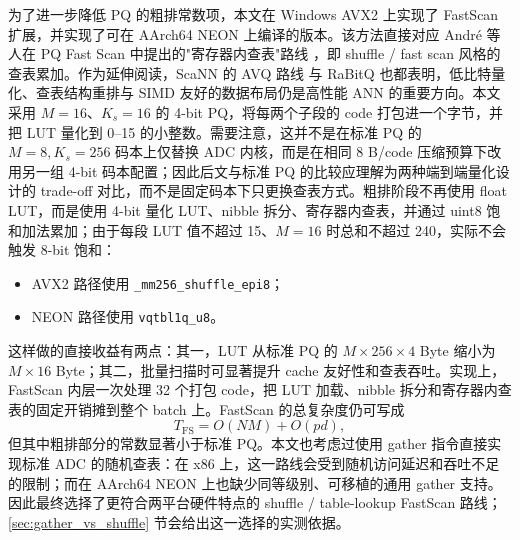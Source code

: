 \documentclass[a4paper,11pt,UTF8]{ctexart}
\begin{document}
为了进一步降低 PQ 的粗排常数项，本文在 Windows AVX2 上实现了 FastScan 扩展，并实现了可在 AArch64 NEON 上编译的版本。该方法直接对应 André 等人在 PQ Fast Scan 中提出的"寄存器内查表"路线 \cite{andre2015fastscan}，即 shuffle / fast scan 风格的查表累加。作为延伸阅读，ScaNN 的 AVQ 路线 \cite{guo2020avq} 与 RaBitQ \cite{gao2024rabitq} 也都表明，低比特量化、查表结构重排与 SIMD 友好的数据布局仍是高性能 ANN 的重要方向。本文采用 $M=16$、$K_s=16$ 的 4-bit PQ，将每两个子段的 code 打包进一个字节，并把 LUT 量化到 0--15 的小整数。需要注意，这并不是在标准 PQ 的 $M=8, K_s=256$ 码本上仅替换 ADC 内核，而是在相同 8 B/code 压缩预算下改用另一组 4-bit 码本配置；因此后文与标准 PQ 的比较应理解为两种端到端量化设计的 trade-off 对比，而不是固定码本下只更换查表方式。粗排阶段不再使用 float LUT，而是使用 4-bit 量化 LUT、nibble 拆分、寄存器内查表，并通过 uint8 饱和加法累加；由于每段 LUT 值不超过 15、$M=16$ 时总和不超过 240，实际不会触发 8-bit 饱和：
\begin{itemize}
  \item AVX2 路径使用 \texttt{\_mm256\_shuffle\_epi8}；
  \item NEON 路径使用 \texttt{vqtbl1q\_u8}。
\end{itemize}

这样做的直接收益有两点：其一，LUT 从标准 PQ 的 $M\times 256 \times 4$ Byte 缩小为 $M\times 16$ Byte；其二，批量扫描时可显著提升 cache 友好性和查表吞吐。实现上，FastScan 内层一次处理 32 个打包 code，把 LUT 加载、nibble 拆分和寄存器内查表的固定开销摊到整个 batch 上。FastScan 的总复杂度仍可写成
\[
T_{\mathrm{FS}} = O(NM) + O(pd),
\]
但其中粗排部分的常数显著小于标准 PQ。本文也考虑过使用 gather 指令直接实现标准 ADC 的随机查表：在 x86 上，这一路线会受到随机访问延迟和吞吐不足的限制；而在 AArch64 NEON 上也缺少同等级别、可移植的通用 gather 支持。因此最终选择了更符合两平台硬件特点的 shuffle / table-lookup FastScan 路线；\ref{sec:gather_vs_shuffle} 节会给出这一选择的实测依据。
\end{document}
